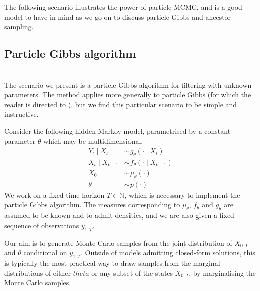 The following scenario illustrates the power of particle MCMC, and is a good model to have in mind as we go on to discuss particle Gibbs and ancestor sampling.


\subsection{Particle Gibbs algorithm \seb{$\sim$} }
\\

The scenario we present is a particle Gibbs algorithm for filtering with unknown parameters. The method applies more generally to particle Gibbs (for which the reader is directed to \textcite[Chapter 5]{lindsten2013}), but we find this particular scenario to be simple and instructive. 

Consider the following hidden Markov model, parametrised by a constant parameter $\theta$ which may be multidimensional.
\begin{align*}
Y_t \mid X_t &\sim g_\theta(\cdot \mid X_t)\\
X_{t} \mid X_{t-1} &\sim f_\theta(\cdot \mid X_{t-1})\\
X_0 &\sim \mu_\theta(\cdot) \\
\theta &\sim p(\cdot)
\end{align*}
We work on a fixed time horizon $T \in \mathbb{N}$, which is necessary to implement the particle Gibbs algorithm.
The measures corresponding to $\mu_\theta$, $f_\theta$ and $g_\theta$ are assumed to be known and to admit densities, and we are also given a fixed sequence of observations $y_{1:T}$. 

Our aim is to generate Monte Carlo samples from the joint distribution of $X_{0:T}$ and $\theta$ conditional on $y_{1:T}$. Outside of models admitting closed-form solutions, this is typically the most practical way to draw samples from the marginal distributions of either $theta$ or any subset of the states $X_{0:T}$, by marginalising the Monte Carlo samples. 

